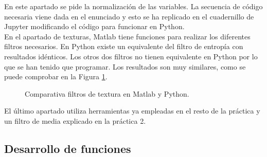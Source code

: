 En este apartado se pide la normalización de las variables. La secuencia de código necesaria viene dada en el enunciado y esto se ha replicado en el cuadernillo de Jupyter modificando el código para funcionar en Python.\\

En el apartado de texturas, Matlab tiene funciones para realizar los diferentes filtros necesarios. En Python existe un equivalente del filtro de entropía con resultados idénticos. Los otros dos filtros no tienen equivalente en Python por lo que se han tenido que programar. Los resultados son muy similares, como se puede comprobar en la Figura \ref{texturas}.\\


\begin{figure}[!tbp]
  \centering
  \hfill
  \caption{Comparativa filtros de textura en Matlab y Python.}
  \label{texturas}
\end{figure}

El último apartado utiliza herramientas ya empleadas en el resto de la práctica y un filtro de media explicado en la práctica 2.\\

\subsection{Desarrollo de funciones}

